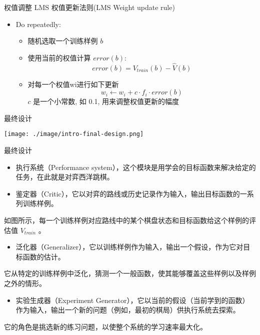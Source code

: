 \documentclass[presentation]{beamer}
\begin{document}
\begin{frame}[label={sec:org04614cd}]{权值调整}
LMS 权值更新法则(LMS Weight update rule)
\begin{itemize}
\item Do repeatedly:
\begin{itemize}
\item 随机选取一个训练样例 \(b\)
\item 使用当前的权值计算 \(error(b)\):
\[error(b) = V_{train}(b) - \hat{V}(b)\]
\item 对每一个权值wi进行如下更新
    \[w_{i} \leftarrow w_{i} + c \cdot f_{i} \cdot error(b) \]
\(c\) 是一个小常数, 如 0.1, 用来调整权值更新的幅度
\end{itemize}
\end{itemize}
\end{frame}

\begin{frame}[label={sec:org32178ff}]{最终设计}
\center
\begin{center}
\texttt{[image: ./image/intro-final-design.png]}
\end{center}
\end{frame}

\begin{frame}[label={sec:org20e170d}]{最终设计}
\begin{itemize}
\item 执行系统（Performance system），这个模块是用学会的目标函数来解决给定的任务，在此就是对弈西洋跳棋。
\end{itemize}

\begin{itemize}
\item 鉴定器（Critic），它以对弈的路线或历史记录作为输入，输出目标函数的一系列训练样例。
\end{itemize}
如图所示，每一个训练样例对应路线中的某个棋盘状态和目标函数给这个样例的评估值 \(V_{train}\) 。

\begin{itemize}
\item 泛化器（Generalizer），它以训练样例作为输入，输出一个假设，作为它对目标函数的估计。
\end{itemize}
它从特定的训练样例中泛化，猜测一个一般函数，使其能够覆盖这些样例以及样例之外的情形。

\begin{itemize}
\item 实验生成器（Experiment Generator），它以当前的假设（当前学到的函数）作为输入，输出一个新的问题（例如，最初的棋局）供执行系统去探索。
\end{itemize}
它的角色是挑选新的练习问题，以使整个系统的学习速率最大化。
\end{frame}
\end{document}
